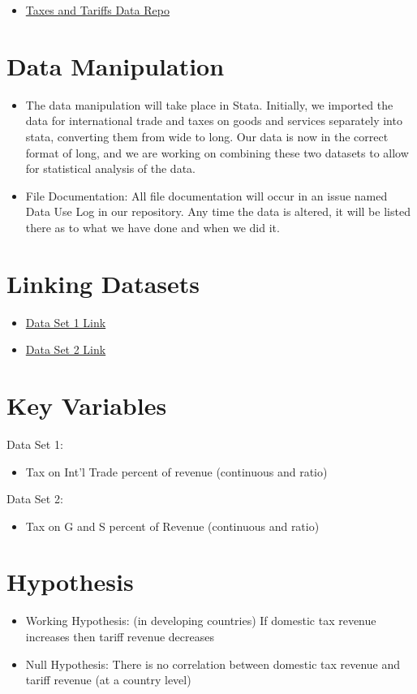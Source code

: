 \documentclass[12pt]{article}
\begin{document}
\noindent
\begin{itemize}

    \item \href{https://github.com/ecn310/course-project-taxes-tariffs/issues/6}{Taxes and Tariffs Data Repo}
\end{itemize}


\section{Data Manipulation}
\label{sec:data}

\begin{itemize}
    \item The data manipulation will take place in Stata. Initially, we imported the data for international trade and taxes on goods and services separately into stata, converting them from wide to long. Our data is now in the correct format of long, and we are working on combining these two datasets to allow for statistical analysis of the data.
    \item File Documentation: All file documentation will occur in an issue named Data Use Log in our repository. Any time the data is altered, it will be listed there as to what we have done and when we did it.
\end{itemize}

\section{Linking Datasets}
\label{sec:discussion}

\begin{itemize}
    \item \href{https://wits.worldbank.org/CountryProfile/en/Country/BY-COUNTRY/StartYear/1988/EndYear/2022/Indicator/GC-TAX-INTT-RV-ZS}{Data Set 1 Link}

 \item \href{https://wits.worldbank.org/CountryProfile/en/country/by-country/startyear/LTST/endyear/LTST/indicator/GC-TAX-GSRV-RV-ZS}{Data Set 2 Link}
\end{itemize}

\section{Key Variables}
\label{sec:result}

Data Set 1: 
\begin{itemize}
 \item Tax on Int'l Trade percent of revenue (continuous and ratio)
\end{itemize}
Data Set 2: 
\begin{itemize}
    \item Tax on G and S percent of Revenue (continuous and ratio)
\end{itemize}
\section{Hypothesis}
\begin{itemize}
    \item Working Hypothesis: (in developing countries) If domestic tax revenue increases then tariff revenue decreases
    \item Null Hypothesis: There is no correlation between domestic tax revenue and tariff revenue (at a country level)
\end{itemize}
\end{document}
